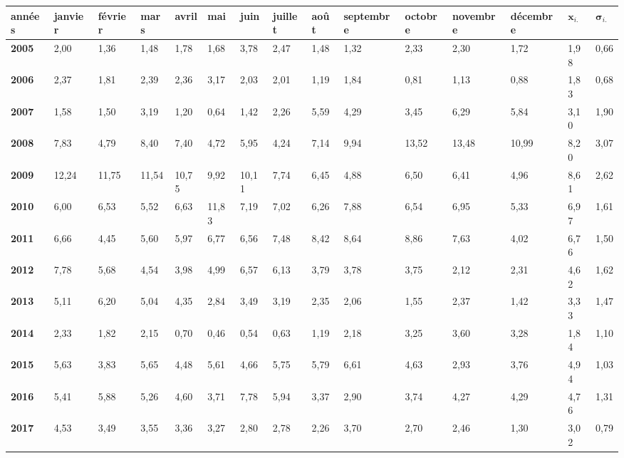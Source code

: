 \renewcommand{\arraystretch}{1.3} %
\begin{tabular}{|l|l|l|l|l|l|l|l|l|l|l|l|l|l|l|}
    \hline
    \textbf{années} & \textbf{janvier} & \textbf{février} & \textbf{mars} & \textbf{avril} & \textbf{mai} & \textbf{juin} & \textbf{juillet} & \textbf{août} & \textbf{septembre} & \textbf{octobre} & \textbf{novembre} & \textbf{décembre} & \textbf{$\bm{x}_{i.}$} & \textbf{$\bm{\sigma}_{i.}$} \\ \hline
    \textbf{2005} & 2,00 & 1,36 & 1,48 & 1,78 & 1,68 & 3,78 & 2,47 & 1,48 & 1,32 & 2,33 & 2,30 & 1,72 & 1,98 & 0,66 \\ \hline
    \textbf{2006} & 2,37 & 1,81 & 2,39 & 2,36 & 3,17 & 2,03 & 2,01 & 1,19 & 1,84 & 0,81 & 1,13 & 0,88 & 1,83 & 0,68 \\ \hline
    \textbf{2007} & 1,58 & 1,50 & 3,19 & 1,20 & 0,64 & 1,42 & 2,26 & 5,59 & 4,29 & 3,45 & 6,29 & 5,84 & 3,10 & 1,90 \\ \hline
    \textbf{2008} & 7,83 & 4,79 & 8,40 & 7,40 & 4,72 & 5,95 & 4,24 & 7,14 & 9,94 & 13,52 & 13,48 & 10,99 & 8,20 & 3,07 \\ \hline
    \textbf{2009} & 12,24 & 11,75 & 11,54 & 10,75 & 9,92 & 10,11 & 7,74 & 6,45 & 4,88 & 6,50 & 6,41 & 4,96 & 8,61 & 2,62 \\ \hline
    \textbf{2010} & 6,00 & 6,53 & 5,52 & 6,63 & 11,83 & 7,19 & 7,02 & 6,26 & 7,88 & 6,54 & 6,95 & 5,33 & 6,97 & 1,61 \\ \hline
    \textbf{2011} & 6,66 & 4,45 & 5,60 & 5,97 & 6,77 & 6,56 & 7,48 & 8,42 & 8,64 & 8,86 & 7,63 & 4,02 & 6,76 & 1,50 \\ \hline
    \textbf{2012} & 7,78 & 5,68 & 4,54 & 3,98 & 4,99 & 6,57 & 6,13 & 3,79 & 3,78 & 3,75 & 2,12 & 2,31 & 4,62 & 1,62 \\ \hline
    \textbf{2013} & 5,11 & 6,20 & 5,04 & 4,35 & 2,84 & 3,49 & 3,19 & 2,35 & 2,06 & 1,55 & 2,37 & 1,42 & 3,33 & 1,47 \\ \hline
    \textbf{2014} & 2,33 & 1,82 & 2,15 & 0,70 & 0,46 & 0,54 & 0,63 & 1,19 & 2,18 & 3,25 & 3,60 & 3,28 & 1,84 & 1,10 \\ \hline
    \textbf{2015} & 5,63 & 3,83 & 5,65 & 4,48 & 5,61 & 4,66 & 5,75 & 5,79 & 6,61 & 4,63 & 2,93 & 3,76 & 4,94 & 1,03 \\ \hline
    \textbf{2016} & 5,41 & 5,88 & 5,26 & 4,60 & 3,71 & 7,78 & 5,94 & 3,37 & 2,90 & 3,74 & 4,27 & 4,29 & 4,76 & 1,31 \\ \hline
    \textbf{2017} & 4,53 & 3,49 & 3,55 & 3,36 & 3,27 & 2,80 & 2,78 & 2,26 & 3,70 & 2,70 & 2,46 & 1,30 & 3,02 & 0,79 \\ \hline

\end{tabular}
